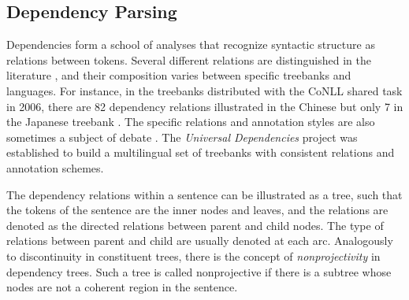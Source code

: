 \documentclass[../document.tex]{subfiles}
\begin{document}
    \subsection{Dependency Parsing}
    Dependencies form a school of analyses that recognize syntactic structure as relations between tokens.
    Several different relations are distinguished in the literature \citep[Table~3 shows the list of dependency relations annotated in the Universal Dependencies treebanks]{de2021universal}, and their composition varies between specific treebanks and languages.
    For instance, in the treebanks distributed with the CoNLL shared task in 2006, there are 82 dependency relations illustrated in the Chinese but only 7 in the Japanese treebank \citep[Table~1]{buchholz2006conll}.
    The specific relations and annotation styles are also sometimes a subject of debate \citep{Gerdes2016DependencyAC,Rehbein2017UniversalDA,osborne2019status}.
    The \emph{Universal Dependencies} project \citep{de2021universal} was established to build a multilingual set of treebanks with consistent relations and annotation schemes.

    The dependency relations within a sentence can be illustrated as a tree, such that the tokens of the sentence are the inner nodes and leaves, and the relations are denoted as the directed relations between parent and child nodes.
    The type of relations between parent and child are usually denoted at each arc.
    Analogously to discontinuity in constituent trees, there is the concept of \emph{nonprojectivity} in dependency trees.
    Such a tree is called nonprojective if there is a subtree whose nodes are not a coherent region in the sentence.
\end{document}
